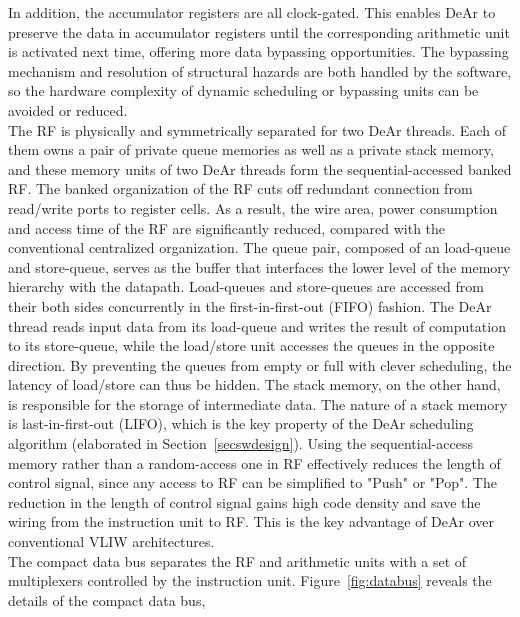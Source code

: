         In addition, the accumulator registers are all clock-gated.
        This enables DeAr to preserve the data in accumulator registers until the corresponding arithmetic unit is activated next time, 
        offering more data bypassing opportunities.
        The bypassing mechanism and resolution of structural hazards are both handled by the software, 
        so the hardware complexity of dynamic scheduling or bypassing units can be avoided or reduced.
        \\\indent
        The RF is physically and symmetrically separated for two DeAr threads.
        Each of them owns a pair of private queue memories as well as a private stack memory, 
        and these memory units of two DeAr threads form the sequential-accessed banked RF.
        The banked organization of the RF cuts off redundant connection from read/write ports to register cells.
        As a result, the wire area, power consumption and access time of the RF are significantly reduced, 
        compared with the conventional centralized organization.
        The queue pair, composed of an load-queue and store-queue, 
        serves as the buffer that interfaces the lower level of the memory hierarchy with the datapath.
        Load-queues and store-queues are accessed from their both sides concurrently in the first-in-first-out (FIFO) fashion.
        The DeAr thread reads input data from its load-queue and writes the result of computation to its store-queue, 
        while the load/store unit accesses the queues in the opposite direction.
        By preventing the queues from empty or full with clever scheduling, the latency of load/store can thus be hidden.
        The stack memory, on the other hand, is responsible for the storage of intermediate data.
        The nature of a stack memory is last-in-first-out (LIFO), 
        which is the key property of the DeAr scheduling algorithm (elaborated in Section~\ref{secswdesign}).
        Using the sequential-access memory rather than a random-access one in RF effectively reduces the length of control signal, 
        since any access to RF can be simplified to "Push" or "Pop".
        The reduction in the length of control signal gains high code density and save the wiring from the instruction unit to RF.
        This is the key advantage of DeAr over conventional VLIW architectures.
        \\\indent
        The compact data bus separates the RF and arithmetic units with a set of multiplexers controlled by the instruction unit.
        Figure~\ref{fig:databus} reveals the details of the compact data bus, 
